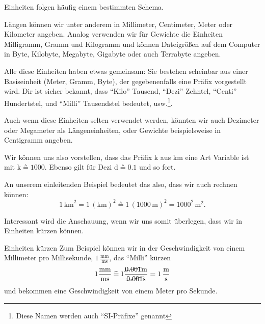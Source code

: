 \documentclass[../../main.tex]{subfiles}
\begin{document}
    Einheiten folgen häufig einem bestimmten Schema.
    \begin{example}{}
        Längen können wir unter anderem in Millimeter, Centimeter, Meter oder Kilometer angeben. Analog verwenden wir
        für Gewichte die Einheiten Milligramm, Gramm und Kilogramm und können Dateigrößen auf dem Computer in Byte,
        Kilobyte, Megabyte, Gigabyte oder auch Terrabyte angeben.

        Alle diese Einheiten haben etwas gemeinsam: Sie bestehen scheinbar aus einer Basiseinheit (Meter, Gramm, Byte),
        der gegebenenfalls eine Präfix vorgestellt wird.
        Dir ist sicher bekannt, dass \enquote{Kilo} Tausend, \enquote{Dezi} Zehntel, \enquote{Centi} Hundertstel, und
        \enquote{Milli} Tausendstel bedeutet, usw.\footnote{Diese Namen werden auch \enquote{SI-Präfixe}
        genannt}.

        Auch wenn diese Einheiten selten verwendet werden, könnten wir auch Dezimeter oder Megameter als
        Längeneinheiten, oder Gewichte beispielsweise in Centigramm angeben.
    \end{example}

    Wir können uns also vorstellen, dass das Präfix $\text{k}$ aus $\text{km}$ eine Art Variable ist mit
    $\text{k} \corresponds 1000$. Ebenso gilt für Dezi $\text{d} \corresponds 0.1$ und so fort.

    \begin{example}{}
        An unserem einleitenden Beispiel bedeutet das also, dass wir auch rechnen können:
        \[1\,\text{km}^2 = 1\,(\text{km})^2 \corresponds 1\,(1000\,\text{m})^2 = 1000^2\,\text{m}^2.\]
    \end{example}

    Interessant wird die Anschauung, wenn wir uns somit überlegen, dass wir in Einheiten kürzen können.

    \begin{example}{Einheiten kürzen}
        Zum Beispiel können wir in der Geschwindigkeit von einem Millimeter pro Millisekunde,
        $1\,\frac{\text{mm}}{\text{ms}}$, das \enquote{Milli} kürzen
        \[
            1\frac{\text{mm}}{\text{ms}} \mathbin{\widehat{=}} 1\frac{\cancel{0.001}\text{m}}{\cancel{0.001}\text{s}}
            = 1\,\frac{\text{m}}{\text{s}}
        \]
        und bekommen eine Geschwindigkeit von einem Meter pro Sekunde.        
    \end{example}
\end{document}
